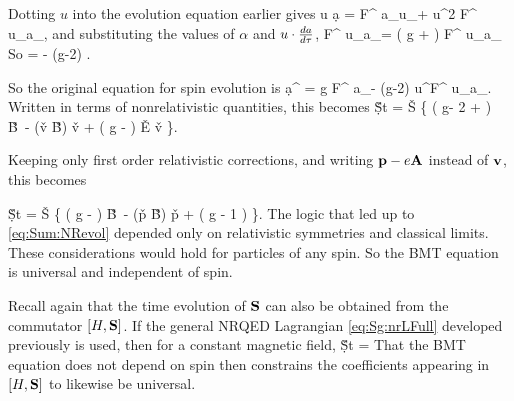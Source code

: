 Dotting $u$ into the evolution equation earlier gives
\beq
	u \cdot \d{a}{\tau}  = \alpha F^{\mu\nu} a_\nu u_\mu + \beta u^2 F^{\mu\lambda} u_\mu a_\lambda,
\eeq
and substituting the values of $\alpha$ and $u \cdot \frac{d a}{d \tau}$,
\beq
	 F^{\mu\nu} u_\mu a_\nu	=	\left( g  + \beta \right)  F^{\mu \nu} u_\mu a_\nu 
\eeq
So 
\beq
	\beta = - (g-2) .
\eeq 

So the original equation for spin evolution is
\beq
\d{a^\mu}{\tau} = 
		g  F^{\mu\nu} a_\nu - (g-2)  u^\nu F^{\mu \lambda} u_\mu a_\lambda.
\eeq
Written in terms of nonrelativistic quantities, this becomes
\beq
	\d{\v{S}}{t} =
		 \v{S} \times \left\{ 
			\left( g- 2 + \right ) \v{B}\
			-  (\v{v} \cdot \v{B}) \v{v} 
			+ \left( g -  \right ) \v{E} \times \v{v}
		\right \}.
\eeq

Keeping only first order relativistic corrections, and writing $\mathbf{p}-e\mathbf{A}$ instead of $\mathbf{v}$, this becomes

\beq \label{eq:Sum:NRevol}
		\d{\v{S}}{t} =
		 \v{S} \times \left\{ 
			\left( g -   \right ) \v{B}\
			-  (\v{p} \cdot \v{B}) \v{p} 
			+ \left( g - 1 \right ) 
		\right \}.
\eeq
The logic that led up to \eqref{eq:Sum:NRevol} depended only on relativistic symmetries and classical limits.  These considerations would hold for particles of any spin.  So the BMT equation is universal and independent of spin.  

Recall again that the time evolution of $\mathbf{S}$ can also be obtained from the commutator $[H, \mathbf{S}]$.  If the general NRQED Lagrangian \eqref{eq:Sg:nrLFull} developed previously is used, then for a constant magnetic field,
\beq
		\d{\v{S}}{t} = 
\eeq
That the BMT equation does not depend on spin then constrains the coefficients appearing in $[H, \mathbf{S}]$ to likewise be universal.  
